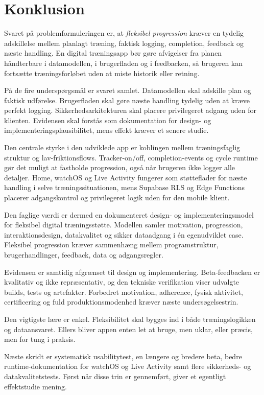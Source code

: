 \section{Konklusion}

Svaret på problemformuleringen er, at \emph{fleksibel progression} kræver en tydelig adskillelse mellem planlagt træning, faktisk logging, completion, feedback og næste handling. En digital træningsapp bør gøre afvigelser fra planen håndterbare i datamodellen, i brugerfladen og i feedbacken, så brugeren kan fortsætte træningsforløbet uden at miste historik eller retning.

På de fire underspørgsmål er svaret samlet. Datamodellen skal adskille plan og faktisk udførelse. Brugerfladen skal gøre næste handling tydelig uden at kræve perfekt logging. Sikkerhedsarkitekturen skal placere privilegeret adgang uden for klienten. Evidensen skal forstås som dokumentation for design- og implementeringsplausibilitet, mens effekt kræver et senere studie.

Den centrale styrke i den udviklede app er koblingen mellem træningsfaglig struktur og lav-friktionsflows. Tracker-on/off, completion-events og cycle runtime gør det muligt at fastholde progression, også når brugeren ikke logger alle detaljer. Home, watchOS og Live Activity fungerer som støtteflader for næste handling i selve træningssituationen, mens Supabase RLS og Edge Functions placerer adgangskontrol og privilegeret logik uden for den mobile klient.

Den faglige værdi er dermed en dokumenteret design- og implementeringsmodel for fleksibel digital træningsstøtte. Modellen samler motivation, progression, interaktionsdesign, datakvalitet og sikker dataadgang i én egenudviklet case. Fleksibel progression kræver sammenhæng mellem programstruktur, brugerhandlinger, feedback, data og adgangsregler.

Evidensen er samtidig afgrænset til design og implementering. Beta-feedbacken er kvalitativ og ikke repræsentativ, og den tekniske verifikation viser udvalgte builds, tests og artefakter. Forbedret motivation, adherence, fysisk aktivitet, certificering og fuld produktionsmodenhed kræver næste undersøgelsestrin.

Den vigtigste lære er enkel. Fleksibilitet skal bygges ind i både træningslogikken og dataansvaret. Ellers bliver appen enten let at bruge, men uklar, eller præcis, men for tung i praksis.

Næste skridt er systematisk usabilitytest, en længere og bredere beta, bedre runtime-dokumentation for watchOS og Live Activity samt flere sikkerheds- og datakvalitetstests. Først når disse trin er gennemført, giver et egentligt effektstudie mening.
